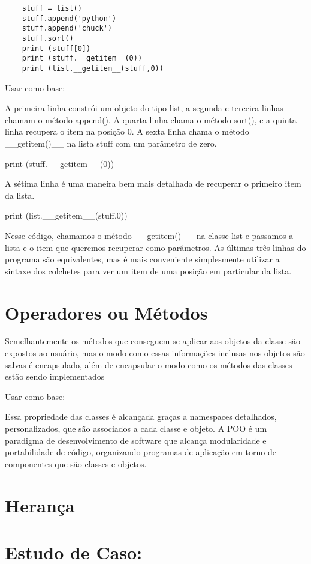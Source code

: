    \begin{lstlisting}
    stuff = list()
    stuff.append('python')
    stuff.append('chuck')
    stuff.sort()
    print (stuff[0])
    print (stuff.__getitem__(0))
    print (list.__getitem__(stuff,0))
    \end{lstlisting}
	
	Usar como base:
	
	A primeira linha constrói um objeto do tipo list, a segunda e terceira linhas chamam o método append(). A quarta linha chama o método sort(), e a quinta linha recupera o item na posição 0.
	A sexta linha chama o método __getitem()__ na lista stuff com um parâmetro de zero. 
	
	print (stuff.__getitem__(0))
	
	A sétima linha é uma maneira bem mais detalhada de recuperar o primeiro item da lista. 
	
	print (list.__getitem__(stuff,0))
	
	Nesse código, chamamos o método __getitem()__ na classe list e passamos a lista e o item que queremos recuperar como parâmetros. As últimas três linhas do programa são equivalentes, mas é mais conveniente simplesmente utilizar a sintaxe dos colchetes para ver um item de uma posição em particular da lista.
	
    \section{Operadores ou Métodos}
	Semelhantemente os métodos que conseguem se aplicar aos objetos da classe são expostos ao usuário, mas o modo como essas informações inclusas nos objetos são salvas é encapsulado, além de encapsular o modo como os métodos das classes estão sendo implementados
	
	Usar como base:
	
	Essa propriedade das classes é alcançada graças a namespaces detalhados, personalizados, que são associados a cada classe e objeto. A POO é um paradigma de desenvolvimento de software que alcança modularidade e portabilidade de código, organizando programas de aplicação em torno de componentes que são classes e objetos.
    \section{Herança}


    \section{Estudo de Caso: }

